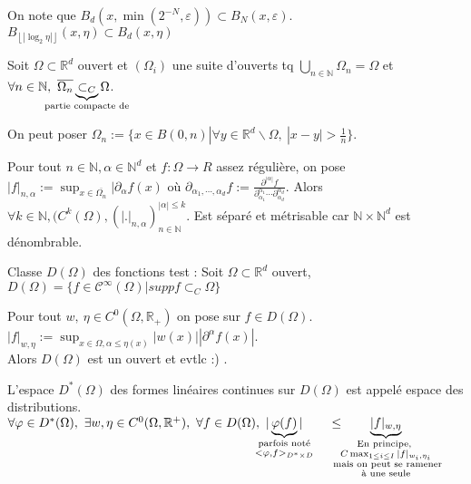 On note que $B_d(x,\min(2^{-N}, \varepsilon ))\subset B_N(x,\varepsilon )$.\\
$B_{\left\lfloor |\log_2\eta| \right\rfloor}(x,\eta)\subset B_d(x, \eta)$

\begin{ex}

Soit $\Omega\subset \mathbb{R} ^d$ ouvert et $(\Omega_i)$ une suite d'ouverts tq $\bigcup_{n\in \mathbb{N} }\Omega_n =\Omega$ et $\forall n\in \mathbb{N} ,\ \overline{\Omega_n}\underbrace{\subset_C }_{\mathclap{\text{partie compacte de}}} \Omega $.
\end{ex}

\begin{remarque}
    On peut poser $\Omega_n:=\{x\in B(0,n)|\forall y\in \mathbb{R} ^d\backslash \Omega,\ |x-y|>\frac{1}{n} \} $.
\end{remarque}

Pour tout $n\in \mathbb{N} , \alpha \in \mathbb{N} ^d$ et $f:\Omega\to R$ assez régulière, on pose $|f|_{n,\alpha }:=\sup_{x\in \overline{\Omega_n}}|\partial_\alpha f(x)$ où $\partial_{\alpha _1,\cdots, \alpha _d}f:=\frac{\partial ^{|\alpha|}f}{\partial_{\alpha_1}^{\alpha _1}\cdots\partial_{\alpha _d}^{\alpha _d} } $. Alors $\forall k\in \mathbb{N} , (C^k(\Omega),(|.|_{n,\alpha })^{|\alpha |\le k}_{n\in \mathbb{N} }  $. Est séparé et métrisable car $\mathbb{N} \times\mathbb{N} ^d$ est dénombrable.

\begin{ex}
    Classe $D(\Omega)$ des fonctions test : Soit $\Omega\subset \mathbb{R} ^d$ ouvert, $D(\Omega)=\{f\in \mathcal{C}^\infty (\Omega)| supp f\subset _C\Omega\} $
\end{ex}

Pour tout $w,\ \eta\in C^0(\Omega,\mathbb{R} _+)$ on pose sur $f\in D(\Omega)$. $|f|_{w,\eta}:=\sup_{x\in \Omega, \alpha \le \eta(x)}|w(x)| |\partial^\alpha f(x)|$. \\

Alors $D(\Omega)$ est un ouvert et evtlc :) .

L'espace $D^*(\Omega)$ des formes linéaires continues sur $D(\Omega)$ est appelé espace des distributions. \\
$\forall \varphi \in D^*(\Omega),\ \exists w,\eta\in C^0(\Omega,\mathbb{R} ^+), \ \forall f\in D(\Omega),\ |\underbrace{\varphi (f)}_{\mathclap{\substack{\text{parfois noté}\\<\varphi ,f>_{D^*\times D}}}}| \hspace{2em}\le \hspace{2em} \underbrace{|f|_{w, \eta}}_{\mathclap{\substack{\text{En principe, }\\ C\max_{1\le i\le I}|f|_{w_i , \eta_i} \\\text{ mais on peut se ramener} \\\text{à une seule}}}}$

